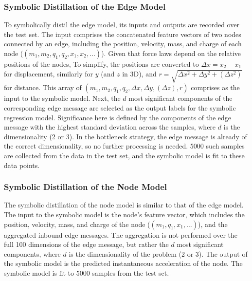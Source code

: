 \documentclass[11pt]{article}
\begin{document}
\subsubsection{Symbolic Distillation of the Edge Model}
To symbolically distil the edge model, its inputs and outputs are recorded over the test set. The input comprises the concatenated feature vectors of two nodes connected by an edge, including the position, velocity, mass, and charge of each node ($(m_1, m_2, q_1, q_2, x_1, x_2, \ldots)$). Given that force laws depend on the relative positions of the nodes, To simplify, the positions are converted to $\Delta x = x_2 - x_1$ for displacement, similarly for $y$ (and $z$ in 3D), and $r = \sqrt{\Delta x^2 + \Delta y^2 + (\Delta z^2)}$ for distance. This array of $(m_1, m_2, q_1, q_2, \Delta x, \Delta y, (\Delta z), r)$ comprises as the input to the symbolic model. Next, the $d$ most significant components of the corresponding edge message are selected as the output labels for the symbolic regression model. Significance here is defined by the components of the edge message with the highest standard deviation across the samples, where $d$ is the dimensionality (2 or 3). In the bottleneck strategy, the edge message is already of the correct dimensionality, so no further processing is needed. 5000 such samples are collected from the data in the test set, and the symbolic model is fit to these data points.

\subsubsection{Symbolic Distillation of the Node Model}
The symbolic distillation of the node model is similar to that of the edge model. The input to the symbolic model is the node's feature vector, which includes the position, velocity, mass, and charge of the node ($(m_1, q_1, x_1, \ldots)$), and the aggregated inbound edge messages. The aggregation is not performed over the full 100 dimensions of the edge message, but rather the $d$ most significant components, where $d$ is the dimensionality of the problem (2 or 3). The output of the symbolic model is the predicted instantaneous acceleration of the node. The symbolic model is fit to 5000 samples from the test set.
\end{document}
